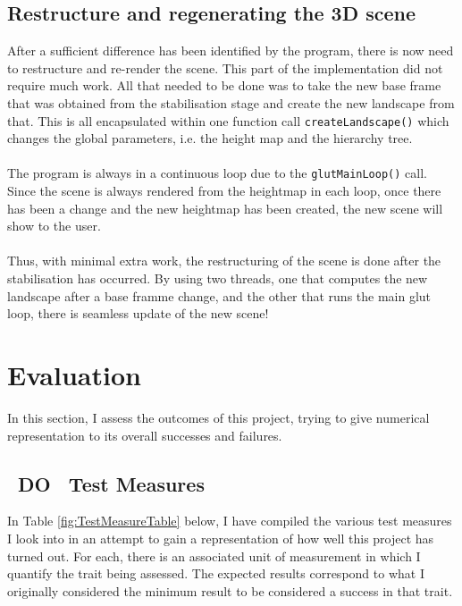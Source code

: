 \documentclass[11pt]{article}
\begin{document}
\subsection{Restructure and regenerating the 3D scene}
After a sufficient difference has been identified by the program, there is
now need to restructure and re-render the scene. This part of
the implementation did not require much work. All that needed to be done was
to take the new base frame that was obtained from the stabilisation
stage and create the new landscape from that. This is all encapsulated 
within one function call \texttt{createLandscape()} which changes
the global parameters, i.e. the height map and the hierarchy tree.\\
\\
The program is always in a continuous loop due to the \texttt{glutMainLoop()}
call. Since the scene is always rendered from the heightmap in each 
loop, once there has been a change and the new heightmap has been created,
the new scene will show to the user.\\
\\
Thus, with minimal extra work, the restructuring of the scene is done
after the stabilisation has occurred. By using two threads, one that
computes the new landscape after a base framme change, and the other
that runs the main glut loop, there is seamless update of the new
scene!

\section{Evaluation}
\label{chapter:evaluation}
In this section, I assess the outcomes of this project, trying to 
give numerical representation to its overall successes and failures.

\subsection{~DO~ Test Measures}
In Table \ref{fig:TestMeasureTable} below, I have compiled the various 
test measures I look into in an attempt to gain a representation of how 
well this project has turned out. For each, there is an associated 
unit of measurement in which I quantify the trait being assessed. 
The expected results correspond to what I originally considered the 
minimum result to be considered a success in that trait.
\end{document}
